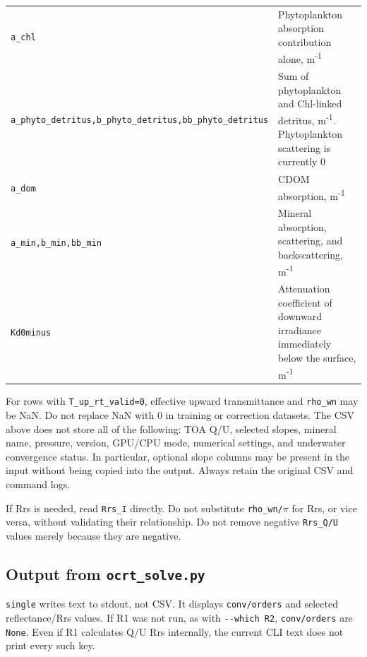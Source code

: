 {\begin{longtable}{@{}>{\raggedright\arraybackslash}p{}>{\raggedright\arraybackslash}p{}@{}}
\texttt{a\_\allowbreak{}chl} & Phytoplankton absorption contribution alone, m\textsuperscript{-}\textsuperscript{1} \\
\texttt{a\_\allowbreak{}phyto\_\allowbreak{}detritus,\allowbreak{}b\_\allowbreak{}phyto\_\allowbreak{}detritus,\allowbreak{}bb\_\allowbreak{}phyto\_\allowbreak{}detritus} & Sum of phytoplankton and Chl-linked detritus, m\textsuperscript{-}\textsuperscript{1}. Phytoplankton scattering is currently 0 \\
\texttt{a\_\allowbreak{}dom} & CDOM absorption, m\textsuperscript{-}\textsuperscript{1} \\
\texttt{a\_\allowbreak{}min,\allowbreak{}b\_\allowbreak{}min,\allowbreak{}bb\_\allowbreak{}min} & Mineral absorption, scattering, and backscattering, m\textsuperscript{-}\textsuperscript{1} \\
\texttt{Kd0minus} & Attenuation coefficient of downward irradiance immediately below the surface, m\textsuperscript{-}\textsuperscript{1} \\
\end{longtable}
}

For rows with \texttt{T\_\allowbreak{}up\_\allowbreak{}rt\_\allowbreak{}valid=\allowbreak{}0}, effective upward transmittance and \texttt{rho\_\allowbreak{}wn} may be NaN. Do not replace NaN with 0 in training or correction datasets. The CSV above does not store all of the following: TOA Q/U, selected slopes, mineral name, pressure, version, GPU/CPU mode, numerical settings, and underwater convergence status. In particular, optional slope columns may be present in the input without being copied into the output. Always retain the original CSV and command logs.

If Rrs is needed, read \texttt{Rrs\_\allowbreak{}I} directly. Do not substitute \texttt{rho\_\allowbreak{}wn/\allowbreak{}\ensuremath{\pi}} for Rrs, or vice versa, without validating their relationship. Do not remove negative \texttt{Rrs\_\allowbreak{}Q/\allowbreak{}U} values merely because they are negative.

\subsection{Output from \texttt{ocrt\_\allowbreak{}solve.\allowbreak{}py}}
\label{sec:auto:06_python_batch:8.2}
\texttt{single} writes text to stdout, not CSV. It displays \texttt{conv/\allowbreak{}orders} and selected reflectance/Rrs values. If R1 was not run, as with \texttt{-\allowbreak{}-\allowbreak{}which R2}, \texttt{conv/\allowbreak{}orders} are \texttt{None}. Even if R1 calculates Q/U Rrs internally, the current CLI text does not print every such key.


